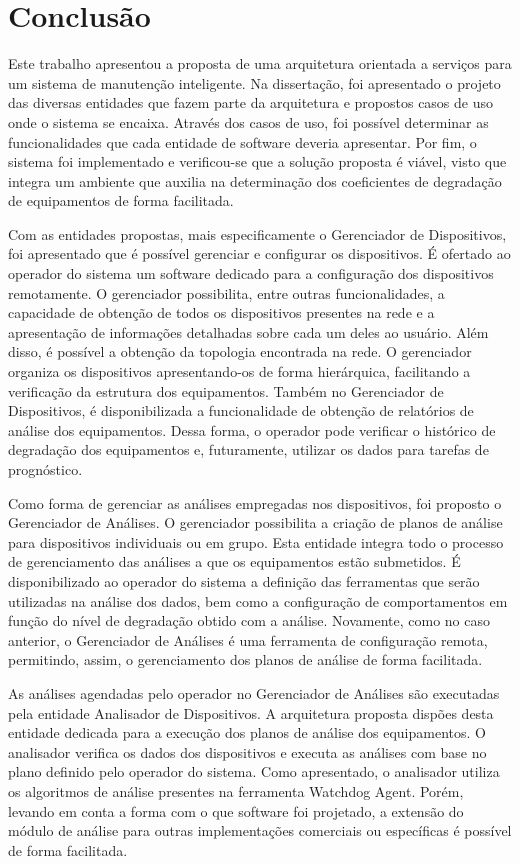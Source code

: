 \chapter{Conclusão}

Este trabalho apresentou a proposta de uma arquitetura orientada a serviços para um sistema de
manutenção inteligente. Na dissertação, foi apresentado o projeto das diversas entidades que fazem
parte da arquitetura e propostos casos de uso onde o sistema se encaixa. Através dos casos de uso,
foi possível determinar as funcionalidades que cada entidade de software deveria apresentar. Por
fim, o sistema foi implementado e verificou-se que a solução proposta é viável, visto que integra um
ambiente que auxilia na determinação dos coeficientes de degradação de equipamentos de forma
facilitada.

Com as entidades propostas, mais especificamente o Gerenciador de Dispositivos, foi apresentado que
é possível gerenciar e configurar os dispositivos. É ofertado ao operador do sistema um software
dedicado para a configuração dos dispositivos remotamente. O gerenciador possibilita, entre outras
funcionalidades, a capacidade de obtenção de todos os dispositivos presentes na rede e a
apresentação de informações detalhadas sobre cada um deles ao usuário. Além disso, é possível a
obtenção da topologia encontrada na rede. O gerenciador organiza os dispositivos apresentando-os de
forma hierárquica, facilitando a verificação da estrutura dos equipamentos. Também no Gerenciador de
Dispositivos, é disponibilizada a funcionalidade de obtenção de relatórios de análise dos
equipamentos. Dessa forma, o operador pode verificar o histórico de degradação dos equipamentos e,
futuramente, utilizar os dados para tarefas de prognóstico.

Como forma de gerenciar as análises empregadas nos dispositivos, foi proposto o Gerenciador de
Análises. O gerenciador possibilita a criação de planos de análise para dispositivos individuais ou
em grupo. Esta entidade integra todo o processo de gerenciamento das análises a que os equipamentos
estão submetidos. É disponibilizado ao operador do sistema a definição das ferramentas que serão
utilizadas na análise dos dados, bem como a configuração de comportamentos em função do nível de
degradação obtido com a análise. Novamente, como no caso anterior, o Gerenciador de Análises é uma
ferramenta de configuração remota, permitindo, assim, o gerenciamento dos planos de análise de forma
facilitada.

As análises agendadas pelo operador no Gerenciador de Análises são executadas pela entidade
Analisador de Dispositivos. A arquitetura proposta dispões desta entidade dedicada para a execução
dos planos de análise dos equipamentos. O analisador verifica os dados dos dispositivos e executa as
análises com base no plano definido pelo operador do sistema. Como apresentado, o analisador utiliza
os algoritmos de análise presentes na ferramenta Watchdog Agent. Porém, levando em conta a forma com
o que software foi projetado, a extensão do módulo de análise para outras implementações comerciais
ou específicas é possível de forma facilitada.

